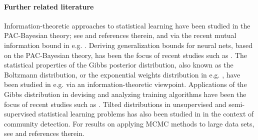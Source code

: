 \documentclass{article}
\begin{document}
\paragraph{Further related literature} Information-theoretic approaches to statistical learning have been studied in the PAC-Bayesian theory; see \cite{catoni2007pac, guedj2019primer, audibert2004pac} and references therein, and via the recent mutual information bound in e.g. \cite{russo2016controlling,xu2017information, raginsky2016information, jiao2017dependence, pensia2018generalization, bassily2017learners, bu2019tightening}. Deriving generalization bounds for neural nets, based on the PAC-Bayesian theory, has been the focus of recent studies such as \cite{dziugaite2017computing, neyshabur2017pac, zhou2018non, dziugaite2018data}. The statistical properties of the Gibbs posterior distribution, also known as the Boltzmann distribution, or the exponential weights distribution in e.g. \cite{rigollet2012sparse}, have been studied in e.g. \cite{zhang1999theoretical, zhang2006e, zhang2006information, xu2017information, raginsky2016information} via an information-theoretic viewpoint. Applications of the Gibbs distribution in devising and analyzing training algorithms have been the focus of recent studies such as \cite{chaudhari2016entropy, raginsky2017non, dziugaite2017entropy}. 
Tilted distributions in unsupervised and semi-supervised statistical learning problems has also been studied in \cite{asadi2017compressing} in the context of community detection.
For results on applying MCMC methods to large data sets, see \cite{bardenet2017markov} and references therein.
\end{document}
